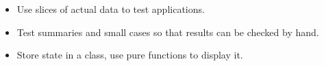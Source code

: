 \begin{itemize}
\item
  Use slices of actual data to test applications.
\item
  Test summaries and small cases so that results can be checked by hand.
\item
  Store state in a class, use pure functions to display it.
\end{itemize}

